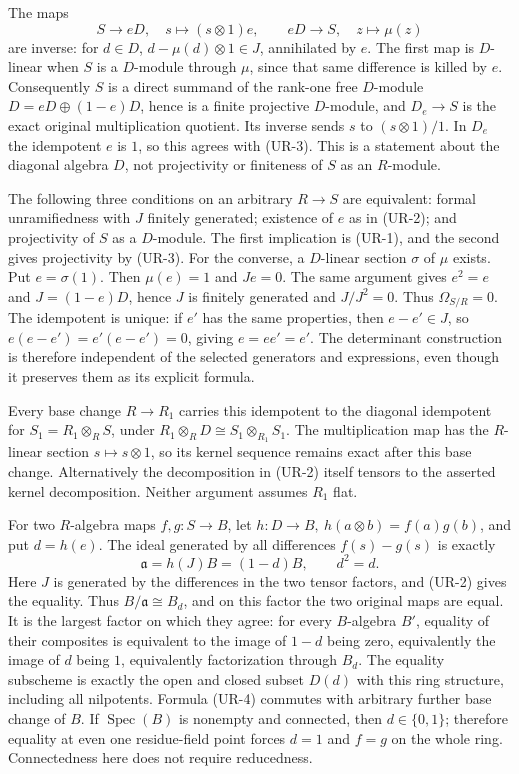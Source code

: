 The maps \[
S\longrightarrow eD,\quad s\longmapsto(s\otimes1)e,\qquad
eD\longrightarrow S,\quad z\longmapsto\mu(z)
\tag{UR-3}
\] are inverse: for \(d\in D\), \(d-\mu(d)\otimes1\in J\), annihilated by \(e\). The first map is \(D\)-linear when \(S\) is a \(D\)-module through \(\mu\), since that same difference is killed by \(e\). Consequently \(S\) is a direct summand of the rank-one free \(D\)-module \(D=eD\oplus(1-e)D\), hence is a finite projective \(D\)-module, and \(D_e\to S\) is the exact original multiplication quotient. Its inverse sends \(s\) to \((s\otimes1)/1\). In \(D_e\) the idempotent \(e\) is \(1\), so this agrees with (UR-3). This is a statement about the diagonal algebra \(D\), not projectivity or finiteness of \(S\) as an \(R\)-module.

The following three conditions on an arbitrary \(R\to S\) are equivalent: formal unramifiedness with \(J\) finitely generated; existence of \(e\) as in (UR-2); and projectivity of \(S\) as a \(D\)-module. The first implication is (UR-1), and the second gives projectivity by (UR-3). For the converse, a \(D\)-linear section \(\sigma\) of \(\mu\) exists. Put \(e=\sigma(1)\). Then \(\mu(e)=1\) and \(Je=0\). The same argument gives \(e^2=e\) and \(J=(1-e)D\), hence \(J\) is finitely generated and \(J/J^2=0\). Thus \(\Omega_{S/R}=0\). The idempotent is unique: if \(e'\) has the same properties, then \(e-e'\in J\), so \(e(e-e')=e'(e-e')=0\), giving \(e=ee'=e'\). The determinant construction is therefore independent of the selected generators and expressions, even though it preserves them as its explicit formula.

Every base change \(R\to R_1\) carries this idempotent to the diagonal idempotent for \(S_1=R_1\otimes_RS\), under \(R_1\otimes_RD\cong S_1\otimes_{R_1}S_1\). The multiplication map has the \(R\)-linear section \(s\mapsto s\otimes1\), so its kernel sequence remains exact after this base change. Alternatively the decomposition in (UR-2) itself tensors to the asserted kernel decomposition. Neither argument assumes \(R_1\) flat.

For two \(R\)-algebra maps \(f,g:S\to B\), let \(h:D\to B,\ h(a\otimes b)=f(a)g(b)\), and put \(d=h(e)\). The ideal generated by all differences \(f(s)-g(s)\) is exactly \[
\mathfrak a=h(J)B=(1-d)B,\qquad d^2=d.
\tag{UR-4}
\] Here \(J\) is generated by the differences in the two tensor factors, and (UR-2) gives the equality. Thus \(B/\mathfrak a\cong B_d\), and on this factor the two original maps are equal. It is the largest factor on which they agree: for every \(B\)-algebra \(B'\), equality of their composites is equivalent to the image of \(1-d\) being zero, equivalently the image of \(d\) being \(1\), equivalently factorization through \(B_d\). The equality subscheme is exactly the open and closed subset \(D(d)\) with this ring structure, including all nilpotents. Formula (UR-4) commutes with arbitrary further base change of \(B\). If \(\operatorname{Spec}(B)\) is nonempty and connected, then \(d\in\{0,1\}\); therefore equality at even one residue-field point forces \(d=1\) and \(f=g\) on the whole ring. Connectedness here does not require reducedness.

